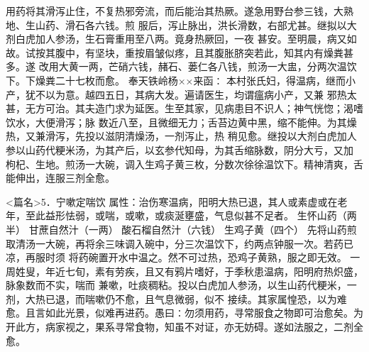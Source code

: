 \documentclass[a4paper,12pt,UTF8,twoside]{ctexbook}
\begin{document}
用药将其滑泻止住，不复热邪旁流，而后能治其热厥。遂急用野台参三钱，大熟地、生山药、滑石各六钱。煎 
服后，泻止脉出，洪长滑数，右部尤甚。继拟以大剂白虎加人参汤，生石膏重用至八两。竟身热厥回，一夜 
甚安。至明晨，病又如故。试按其腹中，有坚块，重按眉皱似疼，且其腹胀脐突若此，知其内有燥粪甚多。遂 
改用大黄一两，芒硝六钱，赭石、蒌仁各八钱，煎汤一大盅，分两次温饮下。下燥粪二十七枚而愈。 
奉天铁岭杨××来函∶ 
本村张氏妇，得温病，继而小产，犹不以为意。越四五日，其病大发。遍请医生，均谓瘟病小产，又兼 
邪热太甚，无方可治。其夫造门求为延医。生至其家，见病患目不识人；神气恍惚；渴嗜饮水，大便滑泻；脉 
数近八至，且微细无力；舌苔边黄中黑，缩不能伸。为其燥热，又兼滑泻，先投以滋阴清燥汤，一剂泻止，热 
稍见愈。继投以大剂白虎加人参以山药代粳米汤，为其产后，以玄参代知母，为其舌缩脉数，阴分大亏，又加 
枸杞、生地。煎汤一大碗，调入生鸡子黄三枚，分数次徐徐温饮下。精神清爽，舌能伸出，连服三剂全愈。 


<篇名>5．宁嗽定喘饮
属性：治伤寒温病，阳明大热已退，其人或素虚或在老年，至此益形怯弱，或喘，或嗽，或痰涎壅盛，气息似甚不足者。 
生怀山药（两半） 甘蔗自然汁（一两） 酸石榴自然汁（六钱） 生鸡子黄（四个） 
先将山药煎取清汤一大碗，再将余三味调入碗中，分三次温饮下，约两点钟服一次。若药已凉，再服时须 
将药碗置开水中温之。然不可过热，恐鸡子黄熟，服之即无效。 
一周姓叟，年近七旬，素有劳疾，且又有鸦片嗜好，于季秋患温病，阳明府热炽盛，脉象数而不实，喘而 
兼嗽，吐痰稠粘。投以白虎加人参汤，以生山药代粳米，一剂，大热已退，而喘嗽仍不愈，且气息微弱，似不 
接续。其家属惶恐，以为难愈。且言如此光景，似难再进药。愚曰∶勿须用药，寻常服食之物即可治愈矣。为 
开此方，病家视之，果系寻常食物，知虽不对证，亦无妨碍。遂如法服之，二剂全愈。 
\end{document}
